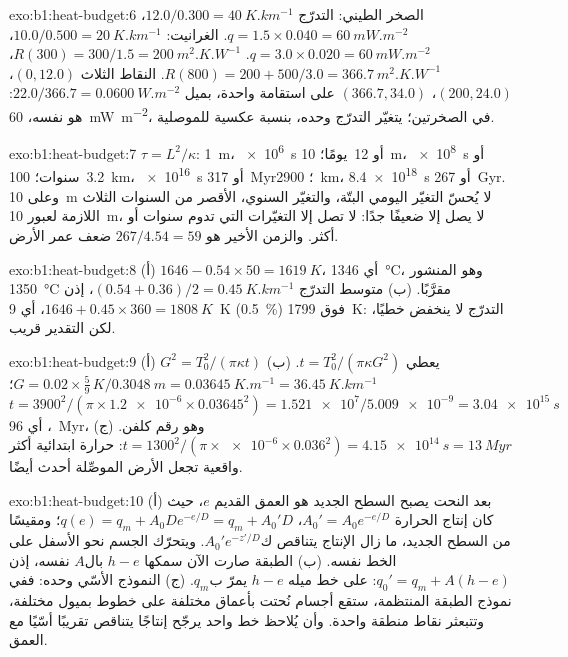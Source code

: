 \begin{solution}{exo:b1:heat-budget:6}
الصخر الطيني: التدرّج $12.0/0.300 = \qty{40}{K.km^{-1}}$، $q = 1.5\times0.040 =
\qty{60}{mW.m^{-2}}$. الغرانيت: $10.0/0.500 = \qty{20}{K.km^{-1}}$،
$q = 3.0\times0.020 = \qty{60}{mW.m^{-2}}$. $R(300) = 300/1.5 =
\qty{200}{m^2.K.W^{-1}}$، $R(800) = 200 + 500/3.0 = \qty{366.7}{m^2.K.W^{-1}}$.
النقاط الثلاث $(0, 12.0)$، $(200, 24.0)$، $(366.7, 34.0)$ على استقامة واحدة، بميل
$22.0/366.7 = \qty{0.0600}{W.m^{-2}}$:  هو نفسه،
\qty{60}{mW.m^{-2}}، في الصخرتين؛ يتغيّر التدرّج وحده، بنسبة عكسية للموصلية.
\end{solution}

\begin{solution}{exo:b1:heat-budget:7}
$\tau = L^2/\kappa$: \qty{1}{m}، \qty{e6}{s} أو \num{12}~يومًا؛ \qty{10}{m}،
\qty{e8}{s} أو \num{3.2}~سنوات؛ \qty{100}{km}، \qty{e16}{s} أو
\qty{317}{Myr}؛ \qty{2900}{km}، \qty{8.4e18}{s} أو \qty{267}{Gyr}. وعلى
\qty{10}{m} لا يُحسّ التغيّر اليومي البتّة، والتغيّر السنوي، الأقصر من السنوات الثلاث اللازمة لعبور \qty{10}{m}، لا يصل إلا ضعيفًا جدًا: لا تصل إلا التغيّرات التي تدوم سنوات أو أكثر. والزمن الأخير هو $267/4.54 = 59$ ضعف عمر الأرض.
\end{solution}

\begin{solution}{exo:b1:heat-budget:8}
(أ) $1646 - 0.54\times50 = \qty{1619}{K}$، أي \qty{1346}{\degreeCelsius}،
وهو المنشور \qty{1350}{\degreeCelsius} مقرَّبًا. (ب) متوسط التدرّج
$(0.54 + 0.36)/2 = \qty{0.45}{K.km^{-1}}$، إذن $1646 + 0.45\times360 =
\qty{1808}{K}$، أي \qty{9}{K} (\qty{0.5}{\percent}) فوق \qty{1799}{K}: التدرّج لا ينخفض خطيًا، لكن التقدير قريب.
\end{solution}

\begin{solution}{exo:b1:heat-budget:9}
(أ) $G^2 = T_0^2/(\pi\kappa t)$ يعطي $t = T_0^2/(\pi\kappa G^2)$.
(ب) $G = 0.02\times\tfrac59\,\unit{K}/\qty{0.3048}{m} = \qty{0.03645}{K.m^{-1}} =
\qty{36.45}{K.km^{-1}}$؛ $t = 3900^2/(\pi\times\num{1.2e-6}\times0.03645^2) =
\num{1.521e7}/\num{5.009e-9} = \qty{3.04e15}{s}$، أي \qty{96}{Myr}، وهو رقم كلفن.
(ج) $t = 1300^2/(\pi\times\num{e-6}\times0.036^2) =
\qty{4.15e14}{s} = \qty{13}{Myr}$: حرارة ابتدائية أكثر واقعية تجعل الأرض الموصِّلة أحدث أيضًا.
\end{solution}

\begin{solution}{exo:b1:heat-budget:10}
(أ) بعد النحت يصبح السطح الجديد هو العمق القديم $e$، حيث كان إنتاج
الحرارة $A_0' = A_0e^{-e/D}$،  $q(e) = q_m +
A_0De^{-e/D} = q_m + A_0'D$؛ ومقيسًا من السطح الجديد، ما زال الإنتاج يتناقص ك$A_0'e^{-z'/D}$. ويتحرّك الجسم نحو الأسفل على الخط نفسه.
(ب) الطبقة صارت الآن سمكها $h - e$ بال$A$ نفسه، إذن $q_0' = q_m + A(h - e)$:
على خط ميله $h - e$ يمرّ ب$q_m$. (ج) النموذج الأسّي وحده: ففي نموذج الطبقة المنتظمة، ستقع أجسام نُحتت بأعماق مختلفة على خطوط بميول مختلفة، وتتبعثر نقاط منطقة واحدة. وأن يُلاحظ خط واحد يرجّح إنتاجًا يتناقص تقريبًا أسّيًا مع العمق.
\end{solution}

